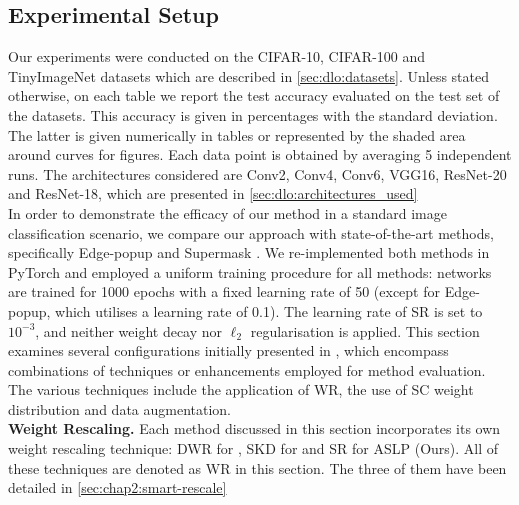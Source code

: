 \subsection{Experimental Setup}
\label{sec:chap2:experimental_setup}

Our experiments were conducted on the CIFAR-10, CIFAR-100 and TinyImageNet
datasets which are described in \cref{sec:dlo:datasets}. Unless stated
otherwise, on each table we report the test accuracy evaluated on the test set
of the datasets. This accuracy is given in percentages with the standard
deviation. The latter is given numerically in tables or represented by the
shaded area around curves for figures. Each data point is obtained by averaging
5 independent runs. The architectures considered are Conv2, Conv4, Conv6, VGG16,
ResNet-20 and ResNet-18, which are presented in \cref{sec:dlo:architectures_used}\\

In order to demonstrate the efficacy of our method in a standard image
classification scenario, we compare our approach with state-of-the-art methods,
specifically Edge-popup \cite{DBLP:conf/cvpr/RamanujanWKFR20} and Supermask
\cite{DBLP:conf/nips/ZhouLLY19}. We re-implemented both methods in PyTorch
\cite{DBLP:conf/nips/PaszkeGMLBCKLGA19} and employed a uniform training
procedure for all methods: networks are trained for 1000 epochs with a fixed
learning rate of 50 (except for Edge-popup, which utilises a learning rate of
0.1). The learning rate of \ac{SR} is set to $10^{-3}$, and  neither weight
decay nor $\ell_2$ regularisation is applied. This section examines several
configurations initially presented in \cite{DBLP:conf/nips/ZhouLLY19}, which
encompass combinations of techniques or enhancements employed for method
evaluation. The various techniques include the application of \ac{WR}, the use
of \ac{SC} weight distribution
\cite{DBLP:conf/nips/ZhouLLY19,DBLP:conf/cvpr/RamanujanWKFR20} and data
augmentation.\\

\noindent\textbf{Weight Rescaling.} Each method discussed in this section
incorporates its own weight rescaling technique: \acf{DWR} for
\cite{DBLP:conf/nips/ZhouLLY19}, \acf{SKD} for
\cite{DBLP:conf/cvpr/RamanujanWKFR20} and \acf{SR} for \ac{ASLP} (Ours). All of
these techniques are denoted as \ac{WR} in this section. The three of them have
been detailed in \cref{sec:chap2:smart-rescale}\\

